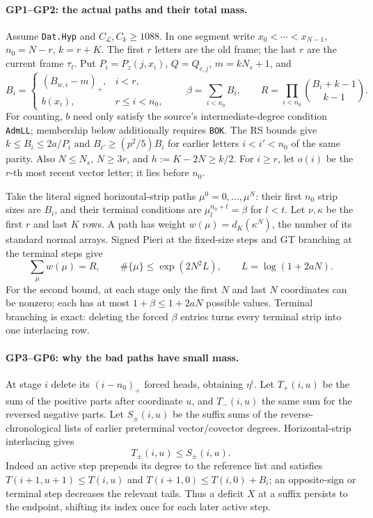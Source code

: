\documentclass[11pt,a4paper]{article}
\numberwithin{equation}{section}
\theoremstyle{remark}\newtheorem{remark}[theorem]{Remark}
\begin{document}
\paragraph{GP1--GP2: the actual paths and their total mass.}
Assume \texttt{Dat.Hyp} and $C_{\mathcal L},C_k\geq1088$.
In one segment write $x_0<\cdots<x_{N-1}$, $n_0=N-r$, $k=r+K$.
The first $r$ letters are the old frame; the last $r$ are the current
frame $\tau_t$.  Put $P_i=P_z(j,x_i)$, $Q=Q_{c,j}$, $m=kN_s+1$, and
\[
 B_i=\begin{cases}(B_{w,i}-m)_+,&i<r,\\b(x_i),&r\leq i<n_0,\end{cases}
 \qquad \beta=\sum_{i<n_0}B_i,\qquad
 R=\prod_{i<n_0}\binom{B_i+k-1}{k-1}.
 \tag{GP1}
\]
For counting, $b$ need only satisfy the source's intermediate-degree
condition \texttt{AdmLL}; membership below additionally requires
\texttt{BOK}.
The RS bounds give $k\leq B_i\leq2a/P_i$ and
$B_{i'}\geq(p^2/5)B_i$ for earlier letters $i<i'<n_0$ of the same
parity.  Also $N\leq N_s$, $N\geq3r$, and
$h:=K-2N\geq k/2$.  For $i\geq r$, let $o(i)$ be the $r$-th most
recent vector letter; it lies before $n_0$.

Take the literal signed horizontal-strip paths $\mu^0=0,\ldots,\mu^N$:
their first $n_0$ strip sizes are $B_i$, and their terminal conditions are
$\mu^{n_0+t}_l=\beta$ for $l<t$.  Let $\nu,\kappa$ be the first $r$
and last $K$ rows.  A path has weight $w(\mu)=d_K(\kappa^N)$, the
number of its standard normal arrays.  Signed Pieri at the fixed-size
steps and GT branching at the terminal steps give
\[
 \sum_{\mu}w(\mu)=R,\qquad
 \#\{\mu\}\leq\exp(2N^2L),\qquad L=\log(1+2aN).
 \tag{GP2}
\]
For the second bound, at each stage only the first $N$ and last $N$
coordinates can be nonzero; each has at most $1+\beta\leq1+2aN$
possible values.  Terminal branching is exact: deleting the forced
$\beta$ entries turns every terminal strip into one interlacing row.

\paragraph{GP3--GP6: why the bad paths have small mass.}
At stage $i$ delete its $(i-n_0)_+$ forced heads, obtaining $\eta^i$.
Let $T_+(i,u)$ be the sum of the positive parts after coordinate $u$,
and $T_-(i,u)$ the same sum for the reversed negative parts.
Let $S_\pm(i,u)$ be the suffix sums of the reverse-chronological lists
of earlier preterminal vector/covector degrees.
Horizontal-strip interlacing gives
\[
 T_\pm(i,u)\leq S_\pm(i,u).
 \tag{GP3}
\]
Indeed an active step prepends its degree to the reference list and
satisfies $T(i+1,u+1)\leq T(i,u)$ and
$T(i+1,0)\leq T(i,0)+B_i$; an opposite-sign or terminal step decreases
the relevant tails.  Thus a deficit $X$ at a suffix persists to the
endpoint, shifting its index once for each later active step.
\end{document}
